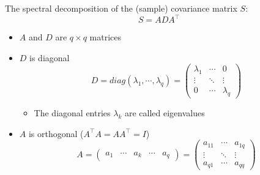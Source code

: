 \documentclass[a4paper]{article}
\begin{document}
The spectral decomposition of the (sample) covariance matrix $S$:
\[S=ADA^{\intercal} \]
\begin{itemize}
    \item $A$ and $D$ are $q\times q$ matrices
    \item $D$ is diagonal
    \begin{equation*}
        D=diag(\lambda_1,\cdots,\lambda_q)=
        \begin{pmatrix}
        \lambda_1 & \cdots & 0 \\
        \vdots & \ddots & \vdots \\
        0 & \cdots & \lambda_q
        \end{pmatrix}
    \end{equation*}
    \begin{itemize}
        \item The diagonal entries $\lambda_k$ are called eigenvalues
    \end{itemize}
    \item $A$ is orthogonal ($A^{\intercal}A=AA^{\intercal}=I$)
    \begin{equation*}
        A=
        \begin{pmatrix}
        a_1 & \cdots & a_k & \cdots & a_q
        \end{pmatrix}=
        \begin{pmatrix}
        a_{11} & \cdots & a_{1q} \\
        \vdots & \ddots & \vdots \\
        a_{q1} & \cdots & a_{qq}
    \end{pmatrix}
    \end{equation*}
\end{itemize}
\end{document}
